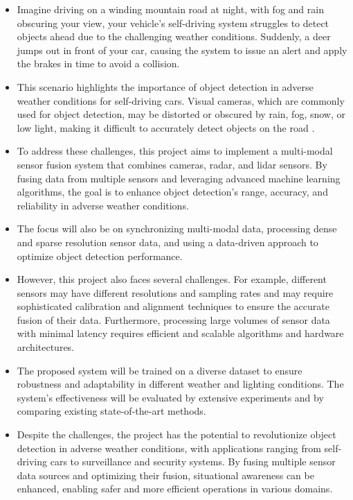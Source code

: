 \documentclass[rnd]{mas_proposal}
\begin{document}
\begin{itemize}
    \item Imagine driving on a winding mountain road at night, with fog and rain obscuring your view, your vehicle's self-driving system struggles to detect objects ahead due to the challenging weather conditions. Suddenly, a deer jumps out in front of your car, causing the system to issue an alert and apply the brakes in time to avoid a collision.
    
    \item This scenario highlights the importance of object detection in adverse weather conditions for self-driving cars. Visual cameras, which are commonly used for object detection, may be distorted or obscured by rain, fog, snow, or low light, making it difficult to accurately detect objects on the road \cite{yurtsever2020survey} \cite{carballo2020libre} \cite{mcity2020}.
    
    \item To address these challenges, this project aims to implement a multi-modal sensor fusion system that combines cameras, radar, and lidar sensors. By fusing data from multiple sensors and leveraging advanced machine learning algorithms, the goal is to enhance object detection's range, accuracy, and reliability in adverse weather conditions.
    
    \item The focus will also be on synchronizing multi-modal data, processing dense and sparse resolution sensor data, and using a data-driven approach to optimize object detection performance.
    
    \item However, this project also faces several challenges. For example, different sensors may have different resolutions and sampling rates and may require sophisticated calibration and alignment techniques to ensure the accurate fusion of their data. Furthermore, processing large volumes of sensor data with minimal latency requires efficient and scalable algorithms and hardware architectures.
    
    \item The proposed system will be trained on a diverse dataset to ensure robustness and adaptability in different weather and lighting conditions. The system's effectiveness will be evaluated by extensive experiments and by comparing existing state-of-the-art methods.
    
    \item Despite the challenges, the project has the potential to revolutionize object detection in adverse weather conditions, with applications ranging from self-driving cars to surveillance and security systems. By fusing multiple sensor data sources and optimizing their fusion, situational awareness can be enhanced, enabling safer and more efficient operations in various domains.
    

\end{itemize}
\end{document}
